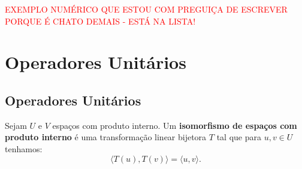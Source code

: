 \documentclass[11pt,twoside,a4paper]{book}
\begin{document}
\bigskip
\noindent
\textcolor{red}{EXEMPLO NUMÉRICO QUE ESTOU COM PREGUIÇA DE ESCREVER PORQUE É CHATO DEMAIS - ESTÁ NA LISTA!}

\newpage

\section{Operadores Unitários}

\subsection{Operadores Unitários}

\begin{definicao}
Sejam $U$ e $V$ espaços com produto interno. Um \textbf{isomorfismo de espaços com produto interno} é uma transformação linear bijetora $T$ tal que para $u,v\in U$ tenhamos:
\[
\langle T(u),T(v)\rangle=\langle u,v\rangle.
\]
\end{definicao}
\end{document}
